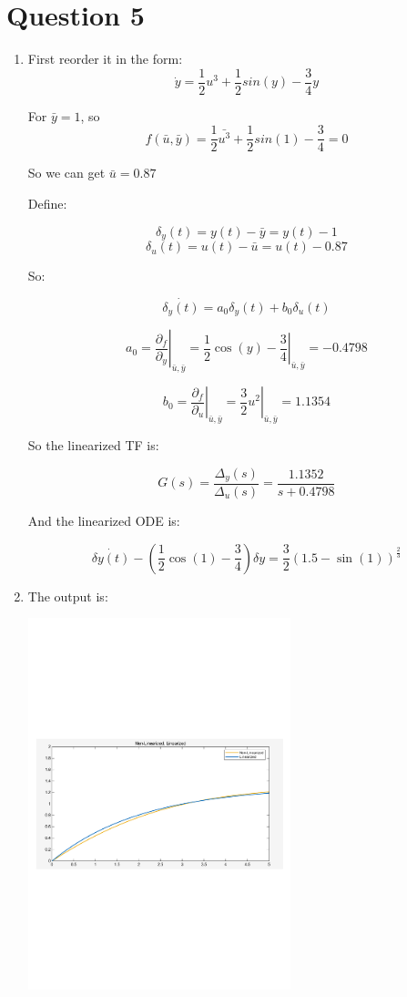 \documentclass[12pt]{article}
\begin{document}
\section*{Question 5}
    \begin{enumerate}[label=(\alph*)]
        \item 
        First reorder it in the form: \[\dot{y} = \frac{1}{2}u^3 + \frac{1}{2}sin(y) - \frac{3}{4}y\]

        For $\bar{y} = 1$, so \[f(\bar{u}, \bar{y}) = \frac{1}{2}\bar{u^3} + \frac{1}{2}sin(1) - \frac{3}{4} = 0\]

        So we can get $\bar{u} = 0.87$

        Define:

        \[\delta_y(t) = y(t) - \bar{y} = y(t) - 1\]
        \[\delta_u(t) = u(t) - \bar{u} = u(t) - 0.87\]

        So:

        \[\dot{\delta_y(t)} = a_0\delta_y(t) + b_0\delta_u(t)\]

        \[a_0 = \left.\frac{\partial_f}{\partial_y}\right|_{\bar{u}, \bar{y}} = \left.\frac{1}{2}\cos(y) - \frac{3}{4}\right|_{\bar{u}, \bar{y}} = -0.4798\]

        \[b_0 = \left.\frac{\partial_f}{\partial_u}\right|_{\bar{u}, \bar{y}} = \left.\frac{3}{2}u^2\right|_{\bar{u}, \bar{y}} = 1.1354\]

        So the linearized TF is:

        \[G(s) = \frac{\Delta_y(s)}{\Delta_u(s)} = \frac{1.1352}{s + 0.4798}\]

        And the linearized ODE is:

        \[\dot{\delta{y(t)}} - (\frac{1}{2}\cos(1) -\frac{3}{4})\delta{y} = \frac{3}{2}(1.5-\sin(1))^\frac{2}{3}\]

        \item The output is:
        \begin{center}
            \includegraphics[width=0.6\textwidth]{Q5sim.png}
        \end{center}

    \end{enumerate}
\end{document}
